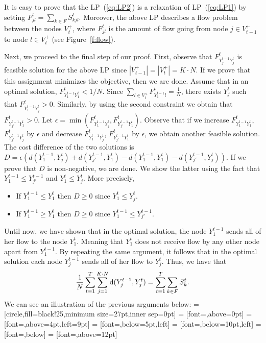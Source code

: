 \begin{proof2}
\noindent
It is easy to prove that the LP~(\ref{eq:LP2}) is a relaxation of LP~(\ref{eq:LP1})
by setting $F_{jl}^t = \sum _{k \in F}S_{kjl}^t$. Moreover, the above LP 
describes a flow 
problem between the nodes $V_t^+$, where $F_{jl}^t$ is the amount of flow 
going from node $j \in V_{t-1}^+$
to node $l \in V_t^+$ (see Figure~\ref{f:flow}).

Next, we proceed to the final step of our proof. First, observe that 
$F^t_{Y_j^{t-1}Y_j^t}$ is feasible
solution for the above LP since $|V_{t-1}^+|=|V_t^+|=K\cdot N$. If we prove that 
this assignment minimizes the objective, then we are done. Assume that in an  
optimal solution, $F^t_{Y_1^{t-1}Y_1^t}<1/N$. 
Since $\sum\limits_{l \in V_t^+} F^t_{Y_1^{t-1}l}=\frac{1}{N}$,
there exists $Y_j^{t}$ such that $F^t_{Y_1^{t-1}Y_j^{t}}>0$. Similarly, by using 
the second constraint we obtain that 
$F^t_{Y_{j'}^{t-1}Y_1^{t}}>0$. Let $\epsilon = 
\min(F^t_{Y_1^{t-1}Y_j^{t}},F^t_{Y_{j'}^{t-1}Y_1^{t}})$. Observe that if we 
increase $F^t_{Y_1^{t-1}Y_1^{t}}$, $F^t_{Y_{j'}^{t-1}Y_j^{t}}$ by $\epsilon$ and 
decrease $F^t_{Y_1^{t-1}Y_j^{t}}$, $F^t_{Y_{j'}^{t-1}Y_1^{t}}$ 
by $\epsilon$, we obtain another feasible solution. The cost difference of the 
two solutions is
$D=\epsilon (d(Y_1^{t-1},Y_j^{t}) + d(Y_{j'}^{t-1},Y_1^{t}) - d(Y_1^{t-1},Y_1^{t}) - 
d(Y_{j'}^{t-1},Y_j^{t}))$. If we prove that $D$ is
non-negative, we are done. We show the latter using the fact that $Y_1^{t-1} \leq 
Y_{j'}^{t-1}$ and $Y_1^{t} \leq Y_j^{t}$. More precisely,
\begin{itemize}
 \item If $Y_1^{t-1} \leq Y_1^{t}$ then $D\geq 0$ since $Y_1^{t} \leq Y_j^{t}$.
 \item If $Y_1^{t-1} \geq Y_1^{t}$ then $D\geq 0$ since $Y_1^{t-1} \leq 
 Y_{j'}^{t-1}$.
\end{itemize}

Until now, we have shown that in the optimal solution, the node $Y_1^{t-1}$ 
sends all of her flow to the node $Y_1^{t}$. Meaning that
$Y_1^{t}$ does not receive flow by any other node apart from $Y_1^{t-1}$. By 
repeating the same argument,
it follows that in the optimal solution each node $Y_j^{t-1}$ sends all of her flow 
to $Y_j^{t}$. Thus, we have that
\begin{equation}\label{eq:mov_cost}
\frac{1}{N}
\sum\limits_{t=1}^T \sum_{j=1}^{K \cdot N} \mathrm{d}(Y^{t-1}_j,Y^t_j)=
\sum_{t=1}^T\sum_{k\in F} S_k^t.
\end{equation}
We can see an illustration of the previous arguments below:
=[circle,fill=black!25,minimum size=27pt,inner sep=0pt]
 = [font=\small,above=0pt]
 = [font=\small,above=4pt,left=9pt]
 = [font=\small,below=5pt,left]
 = [font=\small,below=10pt,left]
 = [font=\small,below]
 = [font=\small,above=12pt]


\end{proof2}
